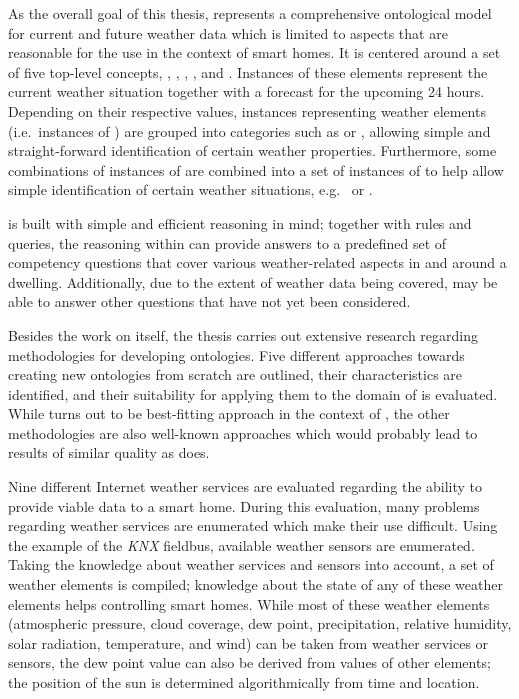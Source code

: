 \vspace{1em}

As the overall goal of this thesis, \smarthomeweather represents a comprehensive ontological model for current and future weather data which is limited to aspects that are reasonable for the use in the context of smart homes. It is centered around a set of five top-level concepts, , , , , and . Instances of these elements represent the current weather situation together with a forecast for the upcoming 24 hours. Depending on their respective values, instances representing weather elements (i.e.\ instances of ) are grouped into categories such as  or , allowing simple and straight-forward identification of certain weather properties. Furthermore, some combinations of instances of  are combined into a set of instances of  to help allow simple identification of certain weather situations, e.g.\  or .

\smarthomeweather is built with simple and efficient  reasoning in mind; together with  rules and  queries, the reasoning within \smarthomeweather can provide answers to a predefined set of competency questions that cover various weather-related aspects in and around a dwelling. Additionally, due to the extent of weather data being covered, \smarthomeweather may be able to answer other questions that have not yet been considered.

Besides the work on \smarthomeweather itself, the thesis carries out extensive research regarding methodologies for developing ontologies. Five different approaches towards creating new ontologies from scratch are outlined, their characteristics are identified, and their suitability for applying them to the domain of \smarthomeweather is evaluated. While \methontology turns out to be best-fitting approach in the context of \smarthomeweather, the other methodologies are also well-known approaches which would probably lead to results of similar quality as \methontology does.

Nine different Internet weather services are evaluated regarding the ability to provide viable data to a smart home. During this evaluation, many problems regarding weather services are enumerated which make their use difficult.  Using the example of the \emph{KNX} fieldbus, available weather sensors are enumerated. Taking the knowledge about weather services and sensors into account, a set of weather elements is compiled; knowledge about the state of any of these weather elements helps controlling smart homes. While most of these weather elements (atmospheric pressure, cloud coverage, dew point, precipitation, relative humidity, solar radiation, temperature, and wind) can be taken from weather services or sensors, the dew point value can also be derived from values of other elements; the position of the sun is determined algorithmically from time and location.


